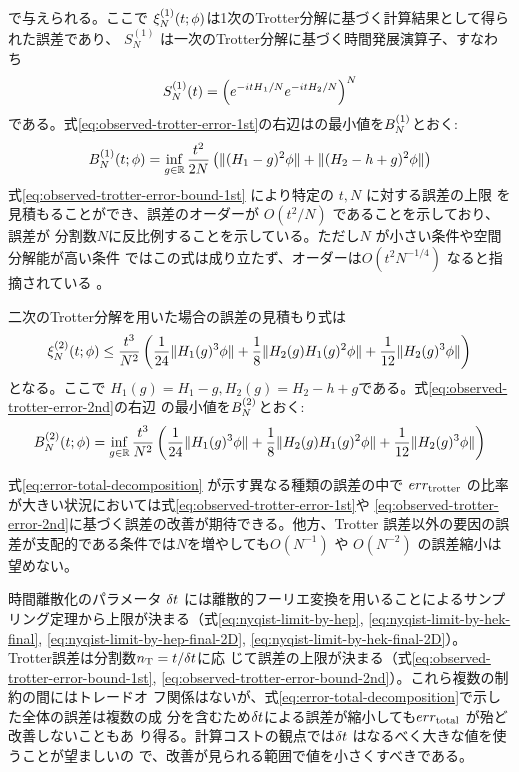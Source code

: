 \documentclass[fontsize=11pt]{jlreq}
\begin{document}
で与えられる\cite{Burgarth2024.PhysRevResearch.6.043155}。ここで
$\xi_{N}^{(1)}(t;\phi)$は1次のTrotter分解に基づく計算結果として得られた誤差であり、
$S_N^{(1)}$ は一次のTrotter分解に基づく時間発展演算子、すなわち
\begin{equation}
    S_{N}^{(1)}(t)=\left(e^{-i{tH}_1/N}e^{-itH_2/N}\right)^N
\end{equation}
である。式\eqref{eq:observed-trotter-error-1st}の右辺はの最小値を$B_{N}^{(1)}$とおく:
\begin{equation}
B_{N}^{(1)}(t;\phi)=\inf_{g\in\mathbb{R}}\frac{t^2}{2N}
    \left(\|(H_1-g)^2\phi\|+\|(H_2-h+g)^2\phi\|\right)
\label{eq:observed-trotter-error-bound-1st}
\end{equation}
式\eqref{eq:observed-trotter-error-bound-1st} により特定の $t,N$ に対する誤差の上限
を見積もることができ、誤差のオーダーが $O(t^2/N)$ であることを示しており、誤差が
分割数$N$に反比例することを示している。ただし$N$ が小さい条件や空間分解能が高い条件
ではこの式は成り立たず、オーダーは$O(t^2 N^{-1/4})$ なると指摘されている
\cite{Burgarth2024.PhysRevResearch.6.043155}。

二次のTrotter分解を用いた場合の誤差の見積もり式は
\begin{equation}
  \xi_{N}^{(2)}(t;\phi)\leq\frac{t^3}{N^2}\left(\frac{1}{24}\|H_1(g)^3\phi\| + \frac{1}{8}\|H_2(g)H_1(g)^2\phi\|
  +\frac{1}{12}\|H_2(g)^3\phi\|\right)
    \label{eq:observed-trotter-error-2nd}
\end{equation}
となる\cite{Burgarth2024.PhysRevResearch.6.043155}。ここで
$H_1(g)=H_1-g,H_2(g)=H_2-h+g$である。式\eqref{eq:observed-trotter-error-2nd}の右辺
の最小値を$B_{N}^{(2)}$とおく:
\begin{equation}
B_{N}^{(2)}(t;\phi)=\inf_{g\in\mathbb{R}}\frac{t^3}{N^2}
    \left(\frac{1}{24}\|H_1(g)^3\phi\| + \frac{1}{8}\|H_2(g)H_1(g)^2\phi\|
  +\frac{1}{12}\|H_2(g)^3\phi\|\right)
\label{eq:observed-trotter-error-bound-2nd}
\end{equation}

式\eqref{eq:error-total-decomposition} が示す異なる種類の誤差の中で $err_{\mathrm{trotter}}$
の比率が大きい状況においては式\eqref{eq:observed-trotter-error-1st}や
\eqref{eq:observed-trotter-error-2nd}に基づく誤差の改善が期待できる。他方、Trotter
誤差以外の要因の誤差が支配的である条件では$N$を増やしても$O(N^{-1})$ や
$O(N^{-2})$ の誤差縮小は望めない。


時間離散化のパラメータ $\delta t$ には離散的フーリエ変換を用いることによるサンプ
リング定理から上限が決まる（式\eqref{eq:nyqist-limit-by-hep},
\eqref{eq:nyqist-limit-by-hek-final}, \eqref{eq:nyqist-limit-by-hep-final-2D},
\eqref{eq:nyqist-limit-by-hek-final-2D}）。 Trotter誤差は分割数$n_{\mathrm{T}}=t/\delta t$に応
じて誤差の上限が決まる（式\eqref{eq:observed-trotter-error-bound-1st},
\eqref{eq:observed-trotter-error-bound-2nd}）。これら複数の制約の間にはトレードオ
フ関係はないが、式\eqref{eq:error-total-decomposition}で示した全体の誤差は複数の成
分を含むため$\delta t$による誤差が縮小しても$err_{\mathrm{total}}$ が殆ど改善しないこともあ
り得る。計算コストの観点では$\delta t$ はなるべく大きな値を使うことが望ましいの
で、改善が見られる範囲で値を小さくすべきである。
\end{document}

